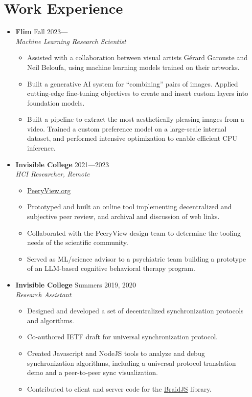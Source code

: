 \documentclass[12pt,letterpaper]{article}
\newenvironment{explist}
{\begin{itemize}[label=\textbf{--},itemsep=1pt,topsep=0pt,partopsep=0pt,parsep=0pt]}
{\end{itemize}}
\begin{document}
\section*{Work Experience} \vspace{-0.5em}
\begin{itemize}[label=]
    \item
        \textbf{Flim} \hfill Fall 2023---\\
        \textit{Machine Learning Research Scientist}
        \begin{explist}
        \item Assisted with a collaboration between visual artists G\'erard Garouste and Neil Beloufa, using machine learning models trained on their artworks.
        \item Built a generative AI system for ``combining'' pairs of images.
            Applied cutting-edge fine-tuning objectives to create and insert custom layers into foundation models.
        \item Built a pipeline to extract the most aesthetically pleasing images from a video.
            Trained a custom preference model on a large-scale internal dataset,
            and performed intensive optimization to enable efficient CPU inference.
        \end{explist}

    \item
        \textbf{Invisible College} \hfill 2021---2023\\
        \textit{HCI Researcher, Remote}
        \begin{explist}
        \item \href{https://peeryview.org}{PeeryView.org}
        \item Prototyped and built an online tool implementing decentralized and subjective peer review, and archival and discussion of web links.
        \item Collaborated with the PeeryView design team to determine the tooling needs of the scientific community.
        \item Served as ML/science advisor to a psychiatric team building a prototype of an LLM-based cognitive behavioral therapy program.
        \end{explist}
    \item
        \textbf{Invisible College} \hfill Summers 2019, 2020\\
        \textit{Research Assistant}
        \begin{explist}
        \item Designed and developed a set of decentralized synchronization protocols and algorithms.
        \item Co-authored IETF draft for universal synchronization protocol.
        \item Created Javascript and NodeJS tools to analyze and debug synchronization algorithms, including a universal protocol translation demo and a peer-to-peer sync visualization.
        \item Contributed to client and server code for the \href{https://github.com/braid-work/braidjs}{BraidJS} library.
        \end{explist}


\end{itemize}
\end{document}
